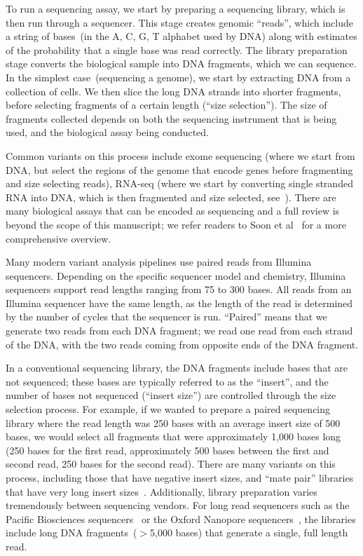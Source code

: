 \documentclass[phd]{ucbthesis}
\begin{document}
To run a sequencing assay, we start by preparing a sequencing library, which is
then run through a sequencer. This stage creates genomic ``reads'', which
include a string of bases~(in the A, C, G, T alphabet used by DNA) along with
estimates of the probability that a single base was read correctly. The library
preparation stage converts the biological sample into DNA fragments, which we
can sequence. In the simplest case~(sequencing a genome), we start by extracting
DNA from a collection of cells. We then slice the long DNA strands into shorter
fragments, before selecting fragments of a certain length (``size selection'').
The size of fragments collected depends on both the sequencing instrument that
is being used, and the biological assay being conducted.

Common variants on this
process include exome sequencing (where we start from DNA, but select the regions
of the genome that encode genes before fragmenting and size selecting reads),
RNA-seq (where we start by converting single stranded RNA into DNA, which is
then fragmented and size selected, see~\cite{mortazavi08}). There are many
biological assays that can be encoded as sequencing and a full review is beyond
the scope of this manuscript; we refer readers to Soon et al~\cite{soon13} for a
more comprehensive overview.

Many modern variant analysis pipelines use paired reads from Illumina
sequencers. Depending on the specific sequencer model and chemistry, Illumina
sequencers support read lengths ranging from 75 to 300 bases. All reads from an
Illumina sequencer have the same length, as the length of the read is determined
by the number of cycles that the sequencer is run. ``Paired''  means that we
generate two reads from each DNA fragment; we read one read from each strand of
the DNA, with the two reads coming from opposite ends of the DNA fragment.

In a conventional sequencing library, the DNA fragments include bases that are
not sequenced; these bases are typically referred to as the ``insert'', and the
number of bases not sequenced (``insert size'') are controlled through the
size selection process. For example, if we wanted to prepare a paired sequencing
library where the read length was 250 bases with an average insert size of 500
bases, we would select all fragments that were approximately 1,000 bases long
(250 bases for the first read, approximately 500 bases between the first and
second read, 250 bases for the second read). There are many variants on this
process, including those that have negative insert sizes, and ``mate pair''
libraries that have very long insert sizes~\cite{mardis13}. Additionally,
library preparation varies tremendously between sequencing vendors. For long
read sequencers such as the Pacific Biosciences sequencers~\cite{eid09} or
the Oxford Nanopore sequencers~\cite{clarke09}, the libraries include long DNA
fragments~($>$5,000 bases) that generate a single, full length read.
\end{document}
